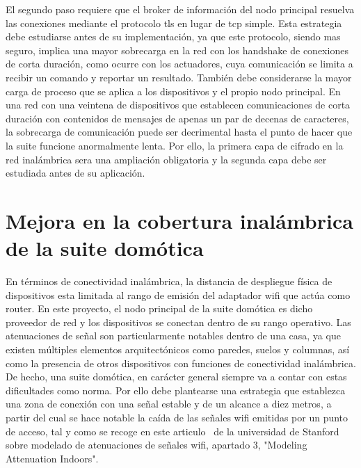 \vspace{1cm}

El segundo paso requiere que el \gls{broker} de información del nodo principal resuelva las conexiones mediante el protocolo \gls{tls} en lugar de \gls{tcp} simple. Esta estrategia debe estudiarse antes de su implementación, ya que este protocolo, siendo mas seguro, implica una mayor sobrecarga en la red con los \gls{handshake} de conexiones de corta duración, como ocurre con los actuadores, cuya comunicación se limita a recibir un comando y reportar un resultado. También debe considerarse la mayor carga de proceso que se aplica a los dispositivos y el propio nodo principal. En una red con una veintena de dispositivos que establecen comunicaciones de corta duración con contenidos de mensajes de apenas un par de decenas de caracteres, la sobrecarga de comunicación puede ser decrimental hasta el punto de hacer que la suite funcione anormalmente lenta. Por ello, la primera capa de cifrado en la red inalámbrica sera una ampliación obligatoria y la segunda capa debe ser estudiada antes de su aplicación.

\section{Mejora en la cobertura inalámbrica de la suite domótica}
\label{ch:Capitulo6.2}

En términos de conectividad inalámbrica, la distancia de despliegue física de dispositivos esta limitada al rango de emisión del adaptador \gls{wifi} que actúa como router. En este proyecto, el nodo principal de la suite domótica es dicho proveedor de red y los dispositivos se conectan dentro de su rango operativo. Las atenuaciones de señal son particularmente notables dentro de una casa, ya que existen múltiples elementos arquitectónicos como paredes, suelos y columnas, así como la presencia de otros dispositivos con funciones de conectividad inalámbrica. De hecho, una suite domótica, en carácter general siempre va a contar con estas dificultades como norma. Por ello debe plantearse una estrategia que establezca una zona de conexión con una señal estable y de un alcance a diez metros, a partir del cual se hace notable la caída de las señales \gls{wifi} emitidas por un punto de acceso, tal y como se recoge en este articulo~\cite{wifiatenuation} de la universidad de Stanford sobre modelado de atenuaciones de señales wifi, apartado 3, "Modeling Attenuation Indoors".

\vspace{1cm}

